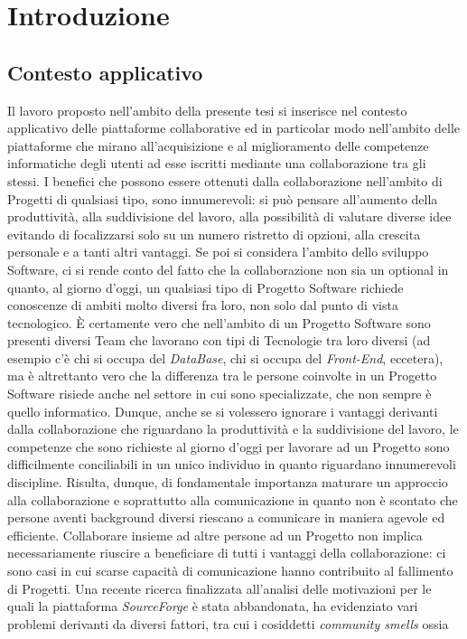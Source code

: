 \chapter{Introduzione}

\section{Contesto applicativo} %
Il lavoro proposto nell'ambito della presente tesi si inserisce nel contesto applicativo delle piattaforme collaborative ed in particolar modo nell'ambito delle piattaforme che mirano all'acquisizione e al miglioramento delle competenze informatiche degli utenti ad esse iscritti mediante una collaborazione tra gli stessi. I benefici che possono essere ottenuti dalla collaborazione nell'ambito di Progetti di qualsiasi tipo, sono innumerevoli: si può pensare all'aumento della produttività, alla suddivisione del lavoro, alla possibilità di valutare diverse idee evitando di focalizzarsi solo su un numero ristretto di opzioni, alla crescita personale e a tanti altri vantaggi. Se poi si considera l'ambito dello sviluppo Software, ci si rende conto del fatto che la collaborazione non sia un optional in quanto, al giorno d'oggi, un qualsiasi tipo di Progetto Software richiede conoscenze di ambiti molto diversi fra loro, non solo dal punto di vista tecnologico. È certamente vero che nell'ambito di un Progetto Software sono presenti diversi Team che lavorano con tipi di Tecnologie tra loro diversi (ad esempio c'è chi si occupa del \emph{DataBase}, chi si occupa del \emph{Front-End}, eccetera), ma è altrettanto vero che la differenza tra le persone coinvolte in un Progetto Software risiede anche nel settore in cui sono specializzate, che non sempre è quello informatico. Dunque, anche se si volessero ignorare i vantaggi derivanti dalla collaborazione che riguardano la produttività e la suddivisione del lavoro, le competenze che sono richieste al giorno d'oggi per lavorare ad un Progetto sono difficilmente conciliabili in un unico individuo in quanto riguardano innumerevoli discipline. Risulta, dunque, di fondamentale importanza maturare un approccio alla collaborazione e soprattutto alla comunicazione in quanto non è scontato che persone aventi background diversi riescano a comunicare in maniera agevole ed efficiente. Collaborare insieme ad altre persone ad un Progetto non implica necessariamente riuscire a beneficiare di tutti i vantaggi della collaborazione: ci sono casi in cui scarse capacità di comunicazione hanno contribuito al fallimento di Progetti. Una recente ricerca \cite{SourceForge} finalizzata all'analisi delle motivazioni per le quali la piattaforma \emph{SourceForge} è stata abbandonata, ha evidenziato vari problemi derivanti da diversi fattori, tra cui i cosiddetti \emph{community smells} ossia 
